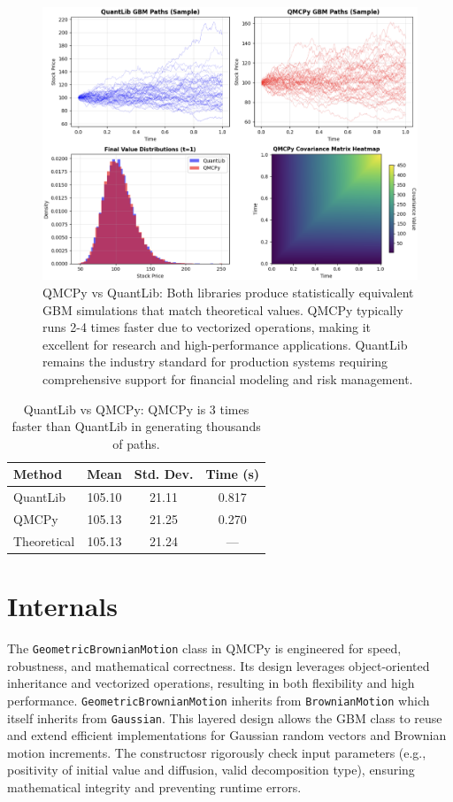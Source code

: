 \documentclass{article}
\begin{document}
\begin{figure}[t!]
\centering
\includegraphics[width=1\textwidth]{images/figure_5.png}
\caption{QMCPy vs QuantLib: Both libraries produce statistically equivalent GBM simulations that match theoretical values. QMCPy typically runs 2-4 times faster due to vectorized operations, making it excellent for research and high-performance applications. QuantLib remains the industry standard for production systems requiring comprehensive  support for financial modeling and risk management.}
\end{figure}

\begin{table}[t]
\centering
\caption{QuantLib vs QMCPy: QMCPy is 3 times faster than QuantLib in generating thousands of paths.}
\begin{tabular}{lccc}
\toprule
\textbf{Method} & \textbf{Mean} & \textbf{Std. Dev.} & \textbf{Time (s)}   \\
\midrule
QuantLib & 105.10 & 21.11 & 0.817  \\
QMCPy & 105.13 & 21.25 & 0.270  \\
Theoretical & 105.13 & 21.24 & ---  \\
\bottomrule
\end{tabular}
\label{tab2}
\end{table}

\section{Internals}

The \texttt{GeometricBrownianMotion} class in QMCPy is engineered for speed, robustness, and mathematical correctness. Its design leverages object-oriented inheritance and vectorized operations, resulting in both flexibility and high performance.
\texttt{GeometricBrownianMotion} inherits from \texttt{BrownianMotion} which itself inherits from \texttt{Gaussian}. This layered design allows the GBM class to reuse and extend efficient implementations for Gaussian random vectors and Brownian motion increments.
The constructosr rigorously check input parameters (e.g., positivity of initial value and diffusion, valid decomposition type), ensuring mathematical integrity and preventing runtime errors.
\end{document}
